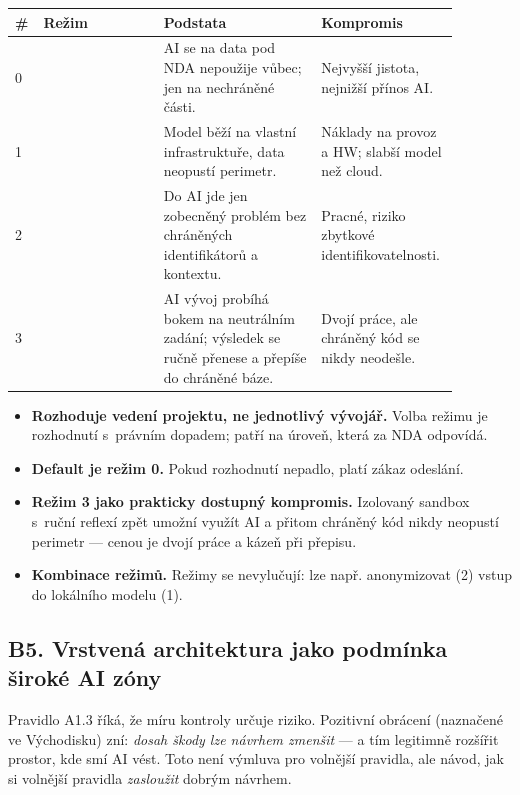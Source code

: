 \medskip
\noindent
\begin{tabularx}{\linewidth}{L{0.05\linewidth} L{0.26\linewidth} L{0.34\linewidth} L{0.23\linewidth}}
\toprule
{}
{\color{white}\textbf{\#}} & {\color{white}\textbf{Režim}} & {\color{white}\textbf{Podstata}} & {\color{white}\textbf{Kompromis}} \\
 &  & AI se na data pod NDA nepoužije vůbec; jen na nechráněné části. & Nejvyšší jistota, nejnižší přínos AI. \\
1 &  & Model běží na vlastní infrastruktuře, data neopustí perimetr. & Náklady na provoz a HW; slabší model než cloud. \\
2 &  & Do AI jde jen zobecněný problém bez chráněných identifikátorů a kontextu. & Pracné, riziko zbytkové identifikovatelnosti. \\
3 &  & AI vývoj probíhá bokem na neutrálním zadání; výsledek se ručně přenese a přepíše do chráněné báze. & Dvojí práce, ale chráněný kód se nikdy neodešle. \\
\bottomrule
\end{tabularx}

\medskip
\begin{itemize}
\item \textbf{Rozhoduje vedení projektu, ne jednotlivý vývojář.}
Volba režimu je rozhodnutí s~právním dopadem; patří na úroveň, která za NDA odpovídá.
\item \textbf{Default je režim 0.}
Pokud rozhodnutí nepadlo, platí zákaz odeslání.
\item \textbf{Režim 3 jako prakticky dostupný kompromis.}
Izolovaný sandbox s~ruční reflexí zpět umožní využít AI a přitom chráněný kód nikdy neopustí perimetr --- cenou je dvojí práce a kázeň při přepisu.
\item \textbf{Kombinace režimů.}
Režimy se nevylučují: lze např. anonymizovat (2) vstup do lokálního modelu (1).
\end{itemize}

\subsection{B5. Vrstvená architektura jako podmínka široké AI zóny}

Pravidlo A1.3 říká, že míru kontroly určuje riziko.
Pozitivní obrácení (naznačené ve Východisku) zní: \emph{dosah škody lze návrhem zmenšit} --- a tím legitimně rozšířit prostor, kde smí AI vést.
Toto není výmluva pro volnější pravidla, ale návod, jak si volnější pravidla \emph{zasloužit} dobrým návrhem.

